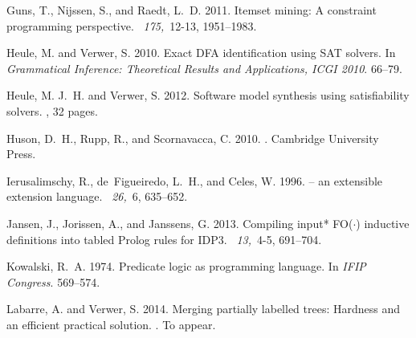 \documentclass{tlp}
\renewcommand{\|}{\ensuremath{\,|\,}}
\renewcommand{\|}{\,|\,}
\begin{document}
\begin{thebibliography}{}
{\sc Guns, T.}, {\sc Nijssen, S.}, {\sc and} {\sc Raedt, L.~D.} 2011.
\newblock Itemset mining: A constraint programming perspective.
~{\em 175,\/}~12-13, 1951--1983.

{\sc Heule, M.} {\sc and} {\sc Verwer, S.} 2010.
\newblock Exact {DFA} identification using {SAT} solvers.
\newblock In {\em Grammatical Inference: Theoretical Results and Applications,
  ICGI 2010}. 66--79.

{\sc Heule, M. J.~H.} {\sc and} {\sc Verwer, S.} 2012.
\newblock Software model synthesis using satisfiability solvers.
, 32 pages.

{\sc Huson, D.~H.}, {\sc Rupp, R.}, {\sc and} {\sc Scornavacca, C.} 2010.
.
\newblock Cambridge University Press.

{\sc Ierusalimschy, R.}, {\sc de~Figueiredo, L.~H.}, {\sc and} {\sc Celes, W.}
  1996.
 -- an extensible extension language.
~{\em 26,\/}~6, 635--652.

{\sc Jansen, J.}, {\sc Jorissen, A.}, {\sc and} {\sc Janssens, G.} 2013.
\newblock Compiling input* {FO}($\cdot$) inductive definitions into tabled
  {P}rolog rules for {IDP3}.
~{\em 13,\/}~4-5,
  691--704.

{\sc Kowalski, R.~A.} 1974.
\newblock Predicate logic as programming language.
\newblock In {\em IFIP Congress}. 569--574.

{\sc Labarre, A.} {\sc and} {\sc Verwer, S.} 2014.
\newblock Merging partially labelled trees: {H}ardness and an efficient
  practical solution.
.
\newblock To appear.


\end{thebibliography}
\end{document}
